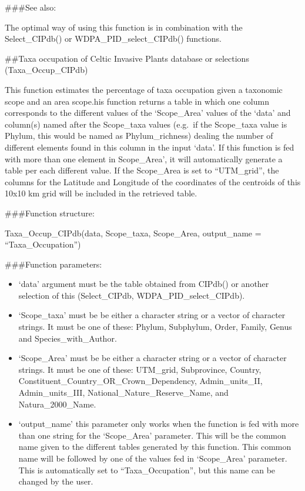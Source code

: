 \documentclass[
]{article}
\providecommand{\tightlist}{%
  \setlength{\itemsep}{0pt}\setlength{\parskip}{0pt}}
\begin{document}
\#\#\#See also:

The optimal way of using this function is in combination with the
Select\_CIPdb() or WDPA\_PID\_select\_CIPdb() functions.

\#\#Taxa occupation of Celtic Invasive Plants database or selections
(Taxa\_Occup\_CIPdb)

This function estimates the percentage of taxa occupation given a
taxonomic scope and an area scope.his function returns a table in which
one column corresponds to the different values of the `Scope\_Area'
values of the `data' and column(s) named after the Scope\_taxa values
(e.g.~if the Scope\_taxa value is Phylum, this would be named as
Phylum\_richness) dealing the number of different elements found in this
column in the input `data'. If this function is fed with more than one
element in Scope\_Area', it will automatically generate a table per each
different value. If the Scope\_Area is set to ``UTM\_grid'', the columns
for the Latitude and Longitude of the coordinates of the centroids of
this 10x10 km grid will be included in the retrieved table.

\#\#\#Function structure:

Taxa\_Occup\_CIPdb(data, Scope\_taxa, Scope\_Area, output\_name =
``Taxa\_Occupation'')

\#\#\#Function parameters:

\begin{itemize}
\tightlist
\item
  `data' argument must be the table obtained from CIPdb() or another
  selection of this (Select\_CIPdb, WDPA\_PID\_select\_CIPdb).
\item
  `Scope\_taxa' must be be either a character string or a vector of
  character strings. It must be one of these: Phylum, Subphylum, Order,
  Family, Genus and Species\_with\_Author.
\item
  `Scope\_Area' must be be either a character string or a vector of
  character strings. It must be one of these: UTM\_grid, Subprovince,
  Country, Constituent\_Country\_OR\_Crown\_Dependency,
  Admin\_units\_II, Admin\_units\_III, National\_Nature\_Reserve\_Name,
  and Natura\_2000\_Name.
\item
  `output\_name' this parameter only works when the function is fed with
  more than one string for the `Scope\_Area' parameter. This will be the
  common name given to the different tables generated by this function.
  This common name will be followed by one of the values fed in
  `Scope\_Area' parameter. This is automatically set to
  ``Taxa\_Occupation'', but this name can be changed by the user.
\end{itemize}
\end{document}
